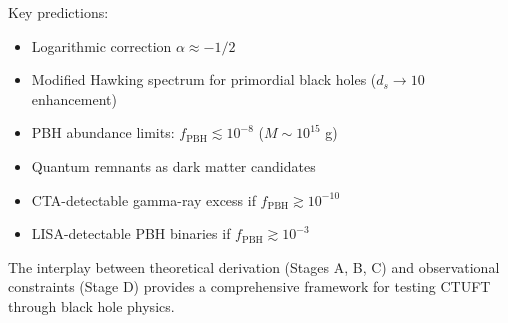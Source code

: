 Key predictions:
\begin{itemize}
    \item Logarithmic correction $\alpha \approx -1/2$
    \item Modified Hawking spectrum for primordial black holes ($d_s \to 10$ enhancement)
    \item PBH abundance limits: $f_{\text{PBH}} \lesssim 10^{-8}$ ($M \sim 10^{15}$ g)
    \item Quantum remnants as dark matter candidates
    \item CTA-detectable gamma-ray excess if $f_{\text{PBH}} \gtrsim 10^{-10}$
    \item LISA-detectable PBH binaries if $f_{\text{PBH}} \gtrsim 10^{-3}$
\end{itemize}

The interplay between theoretical derivation (Stages A, B, C) and observational constraints (Stage D) provides a comprehensive framework for testing CTUFT through black hole physics.
